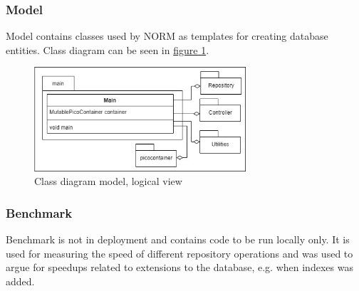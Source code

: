 \subsubsection{Model}
Model contains classes used by NORM as templates for creating database entities. Class diagram can be seen in \hyperref[fig:classDiagramModel]{figure \ref{fig:classDiagramModel}}.
\begin{figure}[H]
    \centering
    \includegraphics[width=0.7\textwidth]{images/class_diagram_model.jpg}
    \caption{Class diagram model, logical view}
    \label{fig:classDiagramModel}
\end{figure}

\subsubsection{Benchmark}
Benchmark is not in deployment and contains code to be run locally only. It is used for measuring the speed of different repository operations and was used to argue for speedups related to extensions to the database, e.g. when indexes was added.


